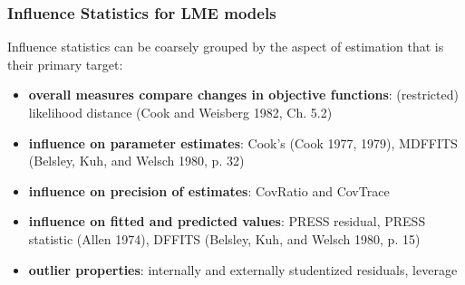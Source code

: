 \documentclass[12pt, a4paper]{report}
\theoremstyle{plain}
\theoremstyle{definition}
\theoremstyle{remark}
\begin{document}
	
	
	
	
	

	\subsubsection{Influence Statistics for LME models} %
	Influence statistics can be coarsely grouped by the aspect of estimation that is their primary target:
	\begin{itemize}
		\item \textbf{overall measures compare changes in objective functions}: (restricted) likelihood distance (Cook and Weisberg 1982, Ch. 5.2)
		\item \textbf{influence on parameter estimates}: Cook's  (Cook 1977, 1979), MDFFITS (Belsley, Kuh, and Welsch 1980, p. 32)
		\item \textbf{influence on precision of estimates}: CovRatio and CovTrace
		\item \textbf{influence on fitted and predicted values}: PRESS residual, PRESS statistic (Allen 1974), DFFITS (Belsley, Kuh, and Welsch 1980, p. 15)
		\item \textbf{outlier properties}: internally and externally studentized residuals, leverage
	\end{itemize}
	
\end{document}
